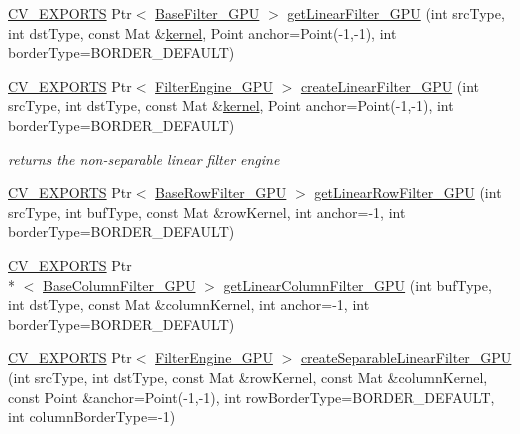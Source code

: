 \begin{DoxyCompactItemize}
\item 
\hyperlink{core_2types__c_8h_a1bf9f0e121b54272da02379cfccd0a2b}{C\-V\-\_\-\-E\-X\-P\-O\-R\-T\-S} Ptr$<$ \hyperlink{classcv_1_1gpu_1_1BaseFilter__GPU}{Base\-Filter\-\_\-\-G\-P\-U} $>$ \hyperlink{namespacecv_1_1gpu_a8b6d0e95f7e2f3482b576b9244fa2c73}{get\-Linear\-Filter\-\_\-\-G\-P\-U} (int src\-Type, int dst\-Type, const Mat \&\hyperlink{imgproc__c_8h_a863a75780ba6c5de552f5361cb0d2c89}{kernel}, Point anchor=Point(-\/1,-\/1), int border\-Type=B\-O\-R\-D\-E\-R\-\_\-\-D\-E\-F\-A\-U\-L\-T)
\item 
\hyperlink{core_2types__c_8h_a1bf9f0e121b54272da02379cfccd0a2b}{C\-V\-\_\-\-E\-X\-P\-O\-R\-T\-S} Ptr$<$ \hyperlink{classcv_1_1gpu_1_1FilterEngine__GPU}{Filter\-Engine\-\_\-\-G\-P\-U} $>$ \hyperlink{namespacecv_1_1gpu_a4eff0a876c702c05c80d12cde3ab9734}{create\-Linear\-Filter\-\_\-\-G\-P\-U} (int src\-Type, int dst\-Type, const Mat \&\hyperlink{imgproc__c_8h_a863a75780ba6c5de552f5361cb0d2c89}{kernel}, Point anchor=Point(-\/1,-\/1), int border\-Type=B\-O\-R\-D\-E\-R\-\_\-\-D\-E\-F\-A\-U\-L\-T)
\begin{DoxyCompactList}\small\item\em returns the non-\/separable linear filter engine \end{DoxyCompactList}\item 
\hyperlink{core_2types__c_8h_a1bf9f0e121b54272da02379cfccd0a2b}{C\-V\-\_\-\-E\-X\-P\-O\-R\-T\-S} Ptr$<$ \hyperlink{classcv_1_1gpu_1_1BaseRowFilter__GPU}{Base\-Row\-Filter\-\_\-\-G\-P\-U} $>$ \hyperlink{namespacecv_1_1gpu_a09d017c88f5907fb446c1dd4a976a850}{get\-Linear\-Row\-Filter\-\_\-\-G\-P\-U} (int src\-Type, int buf\-Type, const Mat \&row\-Kernel, int anchor=-\/1, int border\-Type=B\-O\-R\-D\-E\-R\-\_\-\-D\-E\-F\-A\-U\-L\-T)
\item 
\hyperlink{core_2types__c_8h_a1bf9f0e121b54272da02379cfccd0a2b}{C\-V\-\_\-\-E\-X\-P\-O\-R\-T\-S} Ptr\\*
$<$ \hyperlink{classcv_1_1gpu_1_1BaseColumnFilter__GPU}{Base\-Column\-Filter\-\_\-\-G\-P\-U} $>$ \hyperlink{namespacecv_1_1gpu_a1710eb2f2056726f435ac86e15d8655a}{get\-Linear\-Column\-Filter\-\_\-\-G\-P\-U} (int buf\-Type, int dst\-Type, const Mat \&column\-Kernel, int anchor=-\/1, int border\-Type=B\-O\-R\-D\-E\-R\-\_\-\-D\-E\-F\-A\-U\-L\-T)
\item 
\hyperlink{core_2types__c_8h_a1bf9f0e121b54272da02379cfccd0a2b}{C\-V\-\_\-\-E\-X\-P\-O\-R\-T\-S} Ptr$<$ \hyperlink{classcv_1_1gpu_1_1FilterEngine__GPU}{Filter\-Engine\-\_\-\-G\-P\-U} $>$ \hyperlink{namespacecv_1_1gpu_aa15197c6ae8c4c0afb4d6381615e18a8}{create\-Separable\-Linear\-Filter\-\_\-\-G\-P\-U} (int src\-Type, int dst\-Type, const Mat \&row\-Kernel, const Mat \&column\-Kernel, const Point \&anchor=Point(-\/1,-\/1), int row\-Border\-Type=B\-O\-R\-D\-E\-R\-\_\-\-D\-E\-F\-A\-U\-L\-T, int column\-Border\-Type=-\/1)

\end{DoxyCompactItemize}
